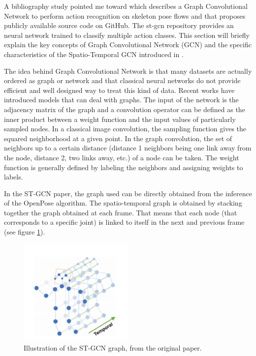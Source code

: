 \documentclass[12pt,a4paper,twoside]{article}
\begin{document}
A bibliography study pointed me toward \cite{Yan2018} which describes a Graph Convolutional Network to perform action recognition on skeleton pose flows and that proposes publicly available source code on GitHub. The st-gcn repository provides an neural network trained to classify multiple action classes. This section will briefly explain the key concepts of Graph Convolutional Network (GCN) and the specific characteristics of the Spatio-Temporal GCN introduced in \cite{Yan2018}.

The idea behind Graph Convolutional Network is that many datasets are actually ordered as graph or network and that classical neural networks do not provide efficient and well designed way to treat this kind of data. Recent works have introduced models that can deal with graphs. The input of the network is the adjacency matrix of the graph and a convolution operator can be defined as the inner product between a weight function and the input values of particularly sampled nodes. In a classical image convolution, the sampling function gives the squared neighborhood at a given point. In the graph convolution, the set of neighbors up to a certain distance (distance 1 neighbors being one link away from the node, distance 2, two links away, etc.) of a node can be taken. The weight function is generally defined by labeling the neighbors and assigning weights to labels.
 
In the ST-GCN paper, the graph used can be directly obtained from the inference of the OpenPose algorithm. The spatio-temporal graph is obtained by \guillemotleft stacking \guillemotright together the graph obtained at each frame. That means that each node (that corresponds to a specific joint) is linked to itself in the next and previous frame (see figure \ref{fig:stgcn_graph}).

\begin{figure}
    \centering
        \includegraphics[width=0.5\textwidth]{images/stgcn_graph}
    \caption{Illustration of the ST-GCN graph, from the original paper.}
    \label{fig:stgcn_graph}
\end{figure}
\end{document}

